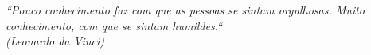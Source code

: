 \documentclass[
  12pt,		%
  a4paper,	%
  openright,%
  oneside,	%
  chapter=TITLE,		%
  section=TITLE,		%
  english,	%
  french,	%
  spanish,	%
  brazil	%
]{abntex2}
\begin{document}
    
    
    \begin{epigrafe}
        \vspace*{\fill}
    	\begin{flushright}
    		\textit{
        		``Pouco conhecimento faz com que as pessoas se sintam orgulhosas. 
                Muito conhecimento, com que se sintam humildes.``\\
        		(Leonardo da Vinci)
    		}
    	\end{flushright}
    \end{epigrafe}
    
    
\end{document}
